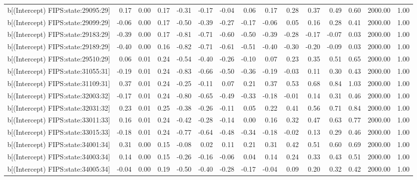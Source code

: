 \begin{table}[ht]
\begin{tabular}{rrrrrrrrrrrrrrr}
  b[(Intercept) FIPS:state:29095:29] & 0.17 & 0.00 & 0.17 & -0.31 & -0.17 & -0.04 & 0.06 & 0.17 & 0.28 & 0.37 & 0.49 & 0.60 & 2000.00 & 1.00 \\ 
  b[(Intercept) FIPS:state:29099:29] & -0.06 & 0.00 & 0.17 & -0.50 & -0.39 & -0.27 & -0.17 & -0.06 & 0.05 & 0.16 & 0.28 & 0.41 & 2000.00 & 1.00 \\ 
  b[(Intercept) FIPS:state:29183:29] & -0.39 & 0.00 & 0.17 & -0.81 & -0.71 & -0.60 & -0.50 & -0.39 & -0.28 & -0.17 & -0.07 & 0.03 & 2000.00 & 1.00 \\ 
  b[(Intercept) FIPS:state:29189:29] & -0.40 & 0.00 & 0.16 & -0.82 & -0.71 & -0.61 & -0.51 & -0.40 & -0.30 & -0.20 & -0.09 & 0.03 & 2000.00 & 1.00 \\ 
  b[(Intercept) FIPS:state:29510:29] & 0.06 & 0.01 & 0.24 & -0.54 & -0.40 & -0.26 & -0.10 & 0.07 & 0.23 & 0.35 & 0.51 & 0.65 & 2000.00 & 1.00 \\ 
  b[(Intercept) FIPS:state:31055:31] & -0.19 & 0.01 & 0.24 & -0.83 & -0.66 & -0.50 & -0.36 & -0.19 & -0.03 & 0.11 & 0.30 & 0.43 & 2000.00 & 1.00 \\ 
  b[(Intercept) FIPS:state:31109:31] & 0.37 & 0.01 & 0.24 & -0.25 & -0.11 & 0.07 & 0.21 & 0.37 & 0.53 & 0.68 & 0.84 & 1.03 & 2000.00 & 1.00 \\ 
  b[(Intercept) FIPS:state:32003:32] & -0.17 & 0.01 & 0.24 & -0.80 & -0.65 & -0.49 & -0.33 & -0.18 & -0.01 & 0.14 & 0.31 & 0.46 & 2000.00 & 1.00 \\ 
  b[(Intercept) FIPS:state:32031:32] & 0.23 & 0.01 & 0.25 & -0.38 & -0.26 & -0.11 & 0.05 & 0.22 & 0.41 & 0.56 & 0.71 & 0.84 & 2000.00 & 1.00 \\ 
  b[(Intercept) FIPS:state:33011:33] & 0.16 & 0.01 & 0.24 & -0.42 & -0.28 & -0.14 & 0.00 & 0.16 & 0.32 & 0.47 & 0.63 & 0.77 & 2000.00 & 1.00 \\ 
  b[(Intercept) FIPS:state:33015:33] & -0.18 & 0.01 & 0.24 & -0.77 & -0.64 & -0.48 & -0.34 & -0.18 & -0.02 & 0.13 & 0.29 & 0.46 & 2000.00 & 1.00 \\ 
  b[(Intercept) FIPS:state:34001:34] & 0.31 & 0.00 & 0.15 & -0.08 & 0.02 & 0.11 & 0.21 & 0.31 & 0.42 & 0.51 & 0.60 & 0.69 & 2000.00 & 1.00 \\ 
  b[(Intercept) FIPS:state:34003:34] & 0.14 & 0.00 & 0.15 & -0.26 & -0.16 & -0.06 & 0.04 & 0.14 & 0.24 & 0.33 & 0.43 & 0.51 & 2000.00 & 1.00 \\ 
  b[(Intercept) FIPS:state:34005:34] & -0.04 & 0.00 & 0.19 & -0.50 & -0.40 & -0.28 & -0.17 & -0.04 & 0.09 & 0.20 & 0.32 & 0.42 & 2000.00 & 1.00 \\ 

\end{tabular}
\end{table}
